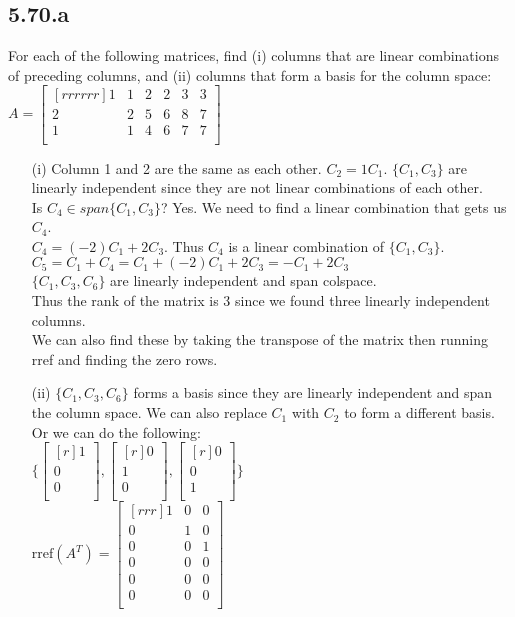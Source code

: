 \documentclass{report}
\begin{document}
\subsection{5.70.a}
For each of the following matrices, find (i) columns that are linear combinations of preceding columns, and (ii) columns that form a basis for the column space:\\	
$A=\begin{bmatrix}[rrrrrr]1&1&2&2&3&3\\2&2&5&6&8&7\\1&1&4&6&7&7\\\end{bmatrix}$
		\begin{enumerate}
		\item[(i)] Column 1 and 2 are the same as each other. $C_2 = 1C_1$. $\{C_1,C_3\}$ are linearly independent since they are not linear combinations of each other.\\
		Is $C_4 \in span\{C_1,C_3\}$? Yes. We need to find a linear combination that gets us $C_4$.\\
		$C_4 = (-2)C_1 + 2C_3$. Thus $C_4$ is a linear combination of $\{C_1,C_3\}$.\\
		$C_5 = C_1+C_4 = C_1+(-2)C_1+2C_3 = -C_1+2C_3$\\
		$\{C_1,C_3,C_6\}$ are linearly independent and span colspace.\\
		Thus the rank of the matrix is 3 since we found three linearly independent columns.\\
		We can also find these by taking the transpose of the matrix then running rref and finding the zero rows. 
		\item[(ii)] 	$\{C_1,C_3,C_6\}$ forms a basis since they are linearly independent and span the column space. We can also replace $C_1$ with $C_2$ to form a different basis. Or we can do the following:\\
		$\{\begin{bmatrix}[r]1\\0\\0\\\end{bmatrix},\begin{bmatrix}[r]0\\1\\0\\\end{bmatrix},\begin{bmatrix}[r]0\\0\\1\\\end{bmatrix}\}$\\
		$\mathrm{rref}(A^T)=\begin{bmatrix}[rrr]1&0&0\\0&1&0\\0&0&1\\0&0&0\\0&0&0\\0&0&0\\\end{bmatrix}$\\		
		\end{enumerate}
		
\end{document}
